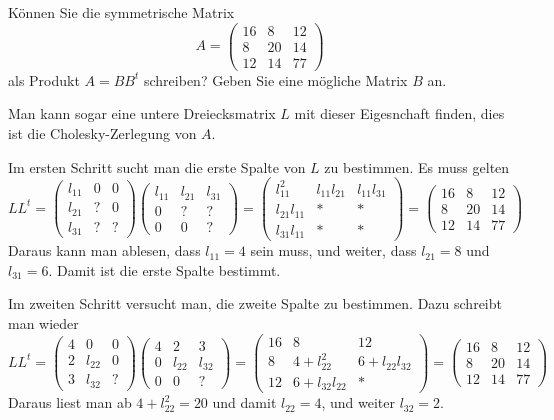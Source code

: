 Können Sie die symmetrische Matrix
\[
A=\begin{pmatrix}
16& 8&12\\
 8&20&14\\
12&14&77
\end{pmatrix}
\]
als Produkt $A=BB^t$ schreiben? Geben Sie eine mögliche Matrix $B$ an.


\begin{loesung}
Man kann sogar eine untere Dreiecksmatrix $L$ mit dieser Eigesnchaft finden,
dies ist die Cholesky-Zerlegung von $A$.

Im ersten Schritt sucht man die erste Spalte von $L$ zu bestimmen.
Es muss gelten
\[
LL^t=
\begin{pmatrix}
l_{11}&  0&  0\\
l_{21}&  ?&  0\\
l_{31}&  ?&  ?
\end{pmatrix}
\begin{pmatrix}
l_{11}&l_{21}&l_{31}\\
     0&     ?&     ?\\
     0&     0&     ?
\end{pmatrix}
=
\begin{pmatrix}
    l_{11}^2&l_{11}l_{21}&l_{11}l_{31}\\
l_{21}l_{11}&           *&           *\\
l_{31}l_{11}&           *&           *
\end{pmatrix}
=
\begin{pmatrix}
16& 8& 12\\
 8&20& 14\\
12&14& 77
\end{pmatrix}
\]
Daraus kann man ablesen, dass $l_{11}=4$ sein muss, und weiter,
dass
$l_{21}=8$ und $l_{31}=6$. Damit ist die erste Spalte bestimmt.

Im zweiten Schritt versucht man, die zweite Spalte zu bestimmen.
Dazu schreibt man wieder
\[
LL^t
=
\begin{pmatrix}
4&     0&0\\
2&l_{22}&0\\
3&l_{32}&?
\end{pmatrix}
\begin{pmatrix}
4&     2&     3\\
0&l_{22}&l_{32}\\
0&     0&?
\end{pmatrix}
=
\begin{pmatrix}
16&              8&            12\\
 8& 4+l_{22}^2    &6+l_{22}l_{32}\\
12& 6+l_{32}l_{22}&             *
\end{pmatrix}
=
\begin{pmatrix}
16& 8& 12\\
 8&20& 14\\
12&14& 77
\end{pmatrix}
\]
Daraus liest man ab $4+l_{22}^2=20$ und damit $l_{22}=4$, und weiter
$l_{32}=2$.


\end{loesung}
